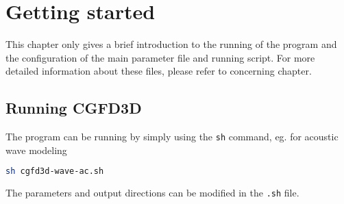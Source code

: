\chapter{Getting started}\label{chapter-run}
This chapter only gives a brief introduction to the running of the program and the configuration of the main parameter file and running script. For more detailed information about these files, please refer to concerning chapter.
\section{Running CGFD3D}
The program can be running by simply using the \texttt{sh} command, eg. for acoustic wave modeling
\begin{lstlisting}[language = bash]
sh cgfd3d-wave-ac.sh
\end{lstlisting}
The parameters and output directions can be modified in the \texttt{.sh} file.

